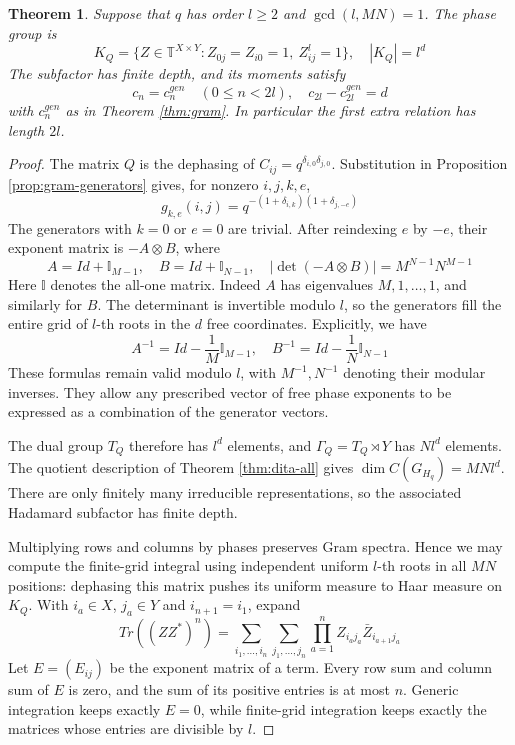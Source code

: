 \documentclass[11pt,reqno]{amsart}
\newtheorem{thm}{Theorem}[section]
\theoremstyle{definition}
\numberwithin{equation}{section}
\begin{document}
\begin{thm}\label{thm:finite-prefix}
Suppose that $q$ has order $l\geq2$ and $\gcd(l,MN)=1$. The phase group is
$$K_Q=\{Z\in\mathbb T^{X\times Y}:Z_{0j}=Z_{i0}=1,\ Z_{ij}^l=1\},\quad |K_Q|=l^d$$
The subfactor has finite depth, and its moments satisfy
$$c_n=c_n^{gen}\quad(0\leq n<2l),\quad c_{2l}-c_{2l}^{gen}=d$$
with $c_n^{gen}$ as in Theorem \ref{thm:gram}. In particular the first extra relation has length $2l$.
\end{thm}
\begin{proof}
The matrix $Q$ is the dephasing of $C_{ij}=q^{\delta_{i,0}\delta_{j,0}}$. Substitution in Proposition \ref{prop:gram-generators} gives, for nonzero $i,j,k,e$,
$$g_{k,e}(i,j)=q^{-(1+\delta_{i,k})(1+\delta_{j,-e})}$$
The generators with $k=0$ or $e=0$ are trivial. After reindexing $e$ by $-e$, their exponent matrix is $-A\otimes B$, where
$$A=Id+\mathbb I_{M-1},\quad B=Id+\mathbb I_{N-1},\quad |\det(-A\otimes B)|=M^{N-1}N^{M-1}$$
Here $\mathbb I$ denotes the all-one matrix. Indeed $A$ has eigenvalues $M,1,\ldots,1$, and similarly for $B$. The determinant is invertible modulo $l$, so the generators fill the entire grid of $l$-th roots in the $d$ free coordinates. Explicitly, we have
$$A^{-1}=Id-\frac1M\mathbb I_{M-1},\quad B^{-1}=Id-\frac1N\mathbb I_{N-1}$$
These formulas remain valid modulo $l$, with $M^{-1},N^{-1}$ denoting their modular inverses. They allow any prescribed vector of free phase exponents to be expressed as a combination of the generator vectors.

The dual group $T_Q$ therefore has $l^d$ elements, and $\Gamma_Q=T_Q\rtimes Y$ has $Nl^d$ elements. The quotient description of Theorem \ref{thm:dita-all} gives $\dim C(G_{H_q})=MNl^d$. There are only finitely many irreducible representations, so the associated Hadamard subfactor has finite depth.

Multiplying rows and columns by phases preserves Gram spectra. Hence we may compute the finite-grid integral using independent uniform $l$-th roots in all $MN$ positions: dephasing this matrix pushes its uniform measure to Haar measure on $K_Q$. With $i_a\in X$, $j_a\in Y$ and $i_{n+1}=i_1$, expand
$$Tr((ZZ^*)^n)=\sum_{i_1,\ldots,i_n}\sum_{j_1,\ldots,j_n}\prod_{a=1}^nZ_{i_aj_a}\bar Z_{i_{a+1}j_a}$$
Let $E=(E_{ij})$ be the exponent matrix of a term. Every row sum and column sum of $E$ is zero, and the sum of its positive entries is at most $n$. Generic integration keeps exactly $E=0$, while finite-grid integration keeps exactly the matrices whose entries are divisible by $l$.


\end{proof}
\end{document}
